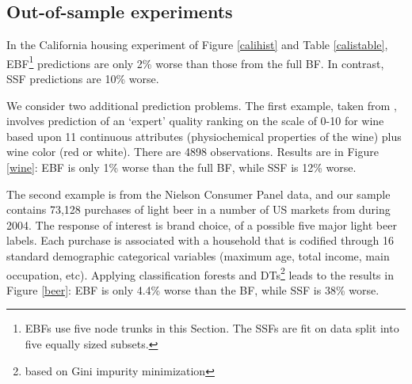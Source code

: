 \documentclass{article}
\begin{document}
\subsection{Out-of-sample experiments}\label{oos-experiment}

 
In the California housing  experiment of Figure \ref{calihist}
and Table \ref{calistable}, EBF\footnote{EBFs use five node trunks  in this Section.  The SSFs are fit on data split into five equally sized subsets.} predictions are only 2\% worse than those from the full BF.  In contrast, SSF predictions are 10\% worse.

We consider two additional prediction problems.  The first example, 
taken from \cite{CorCer09}, involves prediction of an `expert' quality ranking on
the scale of 0-10 for wine based upon 11 continuous attributes (physiochemical properties of the wine) plus
wine color (red or white).  There are 4898 observations.  Results are in Figure \ref{wine}:  EBF is only 1\% worse than the full BF, while SSF is 12\% worse.

The second example is from the Nielson Consumer Panel data,
and our sample contains 73,128 purchases of light beer in a number of US
markets from during 2004. The response of interest is brand choice, of a
possible five major light beer labels.
Each purchase is associated with a household that is codified through
16 standard demographic categorical variables (maximum age, total income, main
occupation, etc).  Applying classification forests and DTs\footnote{based on Gini impurity minimization} leads to the results in Figure \ref{beer}:  EBF is only 4.4\% worse than the BF, while  SSF is 38\% worse.
\end{document}
